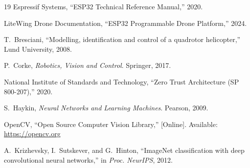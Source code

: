 \documentclass[conference]{IEEEtran}
\begin{document}
\begin{thebibliography}{19}
Espressif Systems, ``ESP32 Technical Reference Manual,'' 2020.

LiteWing Drone Documentation, ``ESP32 Programmable Drone Platform,'' 2024.

T.~Bresciani, ``Modelling, identification and control of a quadrotor helicopter,'' Lund University, 2008.

P.~Corke, \textit{Robotics, Vision and Control}. Springer, 2017.

National Institute of Standards and Technology, ``Zero Trust Architecture (SP 800-207),'' 2020.

S.~Haykin, \textit{Neural Networks and Learning Machines}. Pearson, 2009.

OpenCV, ``Open Source Computer Vision Library,'' [Online]. Available: \url{https://opencv.org}

A.~Krizhevsky, I.~Sutskever, and G.~Hinton, ``ImageNet classification with deep convolutional neural networks,'' in \textit{Proc. NeurIPS}, 2012.

\end{thebibliography}
\end{document}
